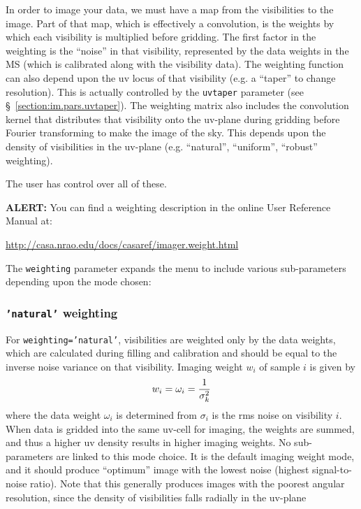 In order to image your data, we must have a map from the visibilities
to the image.  Part of that map, which is effectively a convolution,
is the weights by which each visibility is multiplied before gridding.
The first factor in the weighting is the ``noise'' in that visibility,
represented by the data weights in the MS (which is calibrated along
with the visibility data).
The weighting function can also depend upon the uv locus of that visibility
(e.g. a ``taper'' to change resolution).  This is actually controlled
by the {\tt uvtaper} parameter (see \S~\ref{section:im.pars.uvtaper}).
The weighting matrix also includes the convolution kernel that
distributes that visibility onto the uv-plane during gridding before
Fourier transforming to make the image of the sky.  This depends upon
the density of visibilities in the uv-plane (e.g. ``natural'',
``uniform'', ``robust'' weighting).

The user has control over all of these.

{\bf ALERT:} You can find a weighting description in the online
User Reference Manual at:

\url{http://casa.nrao.edu/docs/casaref/imager.weight.html}


The {\tt weighting} parameter expands the menu to include various 
sub-parameters depending upon the mode chosen:

\subsubsection{{\tt 'natural'} weighting }
\label{section:im.pars.weighting.natural}

For {\tt weighting='natural'}, visibilities are weighted only by the
data weights, which are calculated during filling and calibration and
should be equal to the inverse noise variance on that visibility.
Imaging weight $w_i$ of sample $i$ is given by
\begin{equation}
  w_i = \omega_i = {1 \over \sigma^2_k}
\end{equation}
where the data weight $\omega_i$ is determined from $\sigma_i$ is the
rms noise on visibility $i$.
When data is gridded into the same uv-cell for imaging, the weights
are summed, and thus a higher uv density results in higher imaging
weights.  No sub-parameters are linked to this mode choice.  It is the
default imaging weight mode, and it should produce ``optimum'' image
with the lowest noise (highest signal-to-noise ratio).  Note that
this generally produces images with the poorest angular resolution,
since the density of visibilities falls radially in the uv-plane


